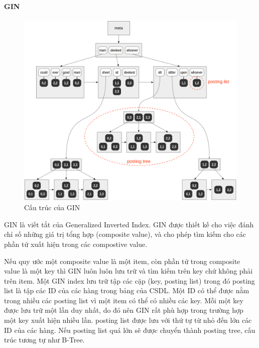 \paragraph{GIN}
\begin{figure}[H]
\centering
\includegraphics[width=13cm]{images/GIN.png}
\caption{Cấu trúc của GIN}
\end{figure}

GIN là viết tắt của Generalized Inverted Index. GIN được thiết
kế cho việc đánh chỉ số những giá trị tổng hợp (composite value),
và cho phép tìm kiếm cho các phần tử xuất hiện
trong các compostive value. 

Nếu quy ước một composite value là một item, còn phần tử trong
composite value là một key thì GIN 
luôn luôn lưu trữ và tìm kiếm trên key chứ không phải trên item.
Một GIN index lưu trữ tập các cặp (key, posting list) trong đó
posting list là tập các ID của các hàng trong bảng của CSDL.
Một ID có thể được nằm trong nhiều các posting list vì một
item có thể có nhiều các key. Mỗi một key được lưu trữ một
lần duy nhất, do đó nên GIN rất phù hợp trong trường hợp một
key xuất hiện nhiều lần. posting list được lưu với thứ tự
từ nhỏ đến lớn các ID của các hàng. Nếu posting list quá lớn
sẽ được chuyển thành posting tree, cấu trúc tương tự như B-Tree. 
